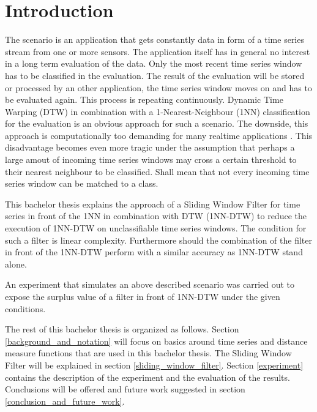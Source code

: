 \section{Introduction}
The scenario is an application that gets constantly data in form of a time series stream from one or more sensors. The
application itself has in general no interest in a long term evaluation of the data. Only the most recent time series
window has to be classified in the evaluation. The result of the evaluation will be stored or processed by an other
application, the time series window moves on and has to be evaluated again. This process is repeating continuously.
Dynamic Time Warping (DTW) in combination with a 1-Nearest-Neighbour (1NN) classification for the evaluation is an
obvious approach for such a scenario. The downside, this approach is computationally too demanding for many realtime
applications \cite{xi2006fast}. This disadvantage becomes even more tragic under the assumption that perhaps a large
amout of incoming time series windows may cross a certain threshold to their nearest neighbour to be classified. Shall
mean that not every incoming time series window can be matched to a class.

This bachelor thesis explains the approach of a Sliding Window Filter for time series in front of the 1NN in combination
with DTW (1NN-DTW) to reduce the execution of 1NN-DTW on unclassifiable time series windows. The condition for such a
filter is linear complexity. Furthermore should the combination of the filter in front of the 1NN-DTW perform with a
similar accuracy as 1NN-DTW stand alone.

An experiment that simulates an above described scenario was carried out to expose the surplus value
of a filter in front of 1NN-DTW under the given conditions.

The rest of this bachelor thesis is organized  as follows. Section \ref{background_and_notation} will focus on basics
around time series and distance measure functions that are used in this bachelor thesis. The Sliding Window Filter will
be explained in section \ref{sliding_window_filter}. Section \ref{experiment} contains the description of the experiment
and the evaluation of the results. Conclusions will be offered and future work suggested in section
\ref{conclusion_and_future_work}.
